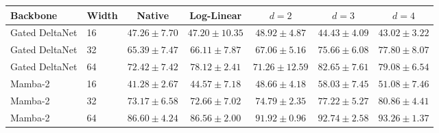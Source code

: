 \begin{tabular}{llccccc}
\toprule
Backbone & Width & Native & Log-Linear & $d=2$ & $d=3$ & $d=4$ \\
\midrule
Gated DeltaNet & 16 & $47.26 \pm 7.70$ & $47.20 \pm 10.35$ & $48.92 \pm 4.87$ & $44.43 \pm 4.09$ & $43.02 \pm 3.22$ \\
Gated DeltaNet & 32 & $65.39 \pm 7.47$ & $66.11 \pm 7.87$ & $67.06 \pm 5.16$ & $75.66 \pm 6.08$ & $77.80 \pm 8.07$ \\
Gated DeltaNet & 64 & $72.42 \pm 7.42$ & $78.12 \pm 2.41$ & $71.26 \pm 12.59$ & $82.65 \pm 7.61$ & $79.08 \pm 6.54$ \\
Mamba-2 & 16 & $41.28 \pm 2.67$ & $44.57 \pm 7.18$ & $48.66 \pm 4.18$ & $58.03 \pm 7.45$ & $51.08 \pm 7.46$ \\
Mamba-2 & 32 & $73.17 \pm 6.58$ & $72.66 \pm 7.02$ & $74.79 \pm 2.35$ & $77.22 \pm 5.27$ & $80.86 \pm 4.41$ \\
Mamba-2 & 64 & $86.60 \pm 4.24$ & $86.56 \pm 2.00$ & $91.92 \pm 0.96$ & $92.74 \pm 2.58$ & $93.26 \pm 1.37$ \\
\bottomrule
\end{tabular}
